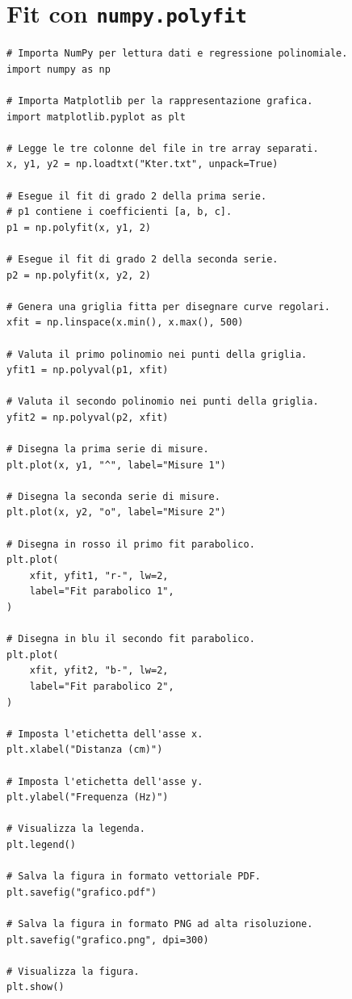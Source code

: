 \documentclass[11pt,a4paper]{book}
\begin{document}
\section{Fit con \texttt{numpy.polyfit}}
\begin{lstlisting}
# Importa NumPy per lettura dati e regressione polinomiale.
import numpy as np

# Importa Matplotlib per la rappresentazione grafica.
import matplotlib.pyplot as plt

# Legge le tre colonne del file in tre array separati.
x, y1, y2 = np.loadtxt("Kter.txt", unpack=True)

# Esegue il fit di grado 2 della prima serie.
# p1 contiene i coefficienti [a, b, c].
p1 = np.polyfit(x, y1, 2)

# Esegue il fit di grado 2 della seconda serie.
p2 = np.polyfit(x, y2, 2)

# Genera una griglia fitta per disegnare curve regolari.
xfit = np.linspace(x.min(), x.max(), 500)

# Valuta il primo polinomio nei punti della griglia.
yfit1 = np.polyval(p1, xfit)

# Valuta il secondo polinomio nei punti della griglia.
yfit2 = np.polyval(p2, xfit)

# Disegna la prima serie di misure.
plt.plot(x, y1, "^", label="Misure 1")

# Disegna la seconda serie di misure.
plt.plot(x, y2, "o", label="Misure 2")

# Disegna in rosso il primo fit parabolico.
plt.plot(
    xfit, yfit1, "r-", lw=2,
    label="Fit parabolico 1",
)

# Disegna in blu il secondo fit parabolico.
plt.plot(
    xfit, yfit2, "b-", lw=2,
    label="Fit parabolico 2",
)

# Imposta l'etichetta dell'asse x.
plt.xlabel("Distanza (cm)")

# Imposta l'etichetta dell'asse y.
plt.ylabel("Frequenza (Hz)")

# Visualizza la legenda.
plt.legend()

# Salva la figura in formato vettoriale PDF.
plt.savefig("grafico.pdf")

# Salva la figura in formato PNG ad alta risoluzione.
plt.savefig("grafico.png", dpi=300)

# Visualizza la figura.
plt.show()
\end{lstlisting}
\end{document}
